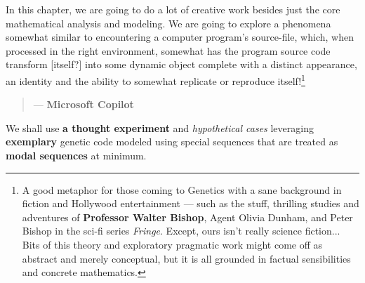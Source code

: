 \documentclass[a4paper, 18pt]{book} %
\begin{document}
\vspace{2em}

In this chapter, we are going to do a lot of creative work besides just the core mathematical analysis and modeling. We are going to explore a phenomena somewhat similar to encountering a computer program's source-file, which, when processed in the right environment, somewhat has the program source code transform [itself?] into some dynamic object complete with a distinct appearance, an identity and the ability to somewhat replicate or reproduce itself!\footnote{A good metaphor for those coming to Genetics with a sane background in fiction and Hollywood entertainment --- such as the stuff, thrilling studies and adventures of \textbf{Professor Walter Bishop}, Agent Olivia Dunham, and Peter Bishop in the sci-fi series \textit{Fringe}. Except, ours isn't really science fiction... Bits of this theory and exploratory pragmatic work might come off as abstract and merely conceptual, but it is all grounded in factual sensibilities and concrete mathematics.}

\vspace{2em}

\noindent
\begin{minipage}{1\textwidth}
\vspace{1em}
\begin{quotation}
\hspace*{\fill} --- \textbf{Microsoft Copilot}\cite{copilot_dna_assistant}
\end{quotation}
\vspace{1em}
\end{minipage}

\vspace{2em}




We shall use \textbf{a thought experiment} and \textit{hypothetical cases} leveraging \textbf{exemplary} genetic code modeled using special sequences that are treated as \textbf{modal sequences} at minimum.
\end{document}
